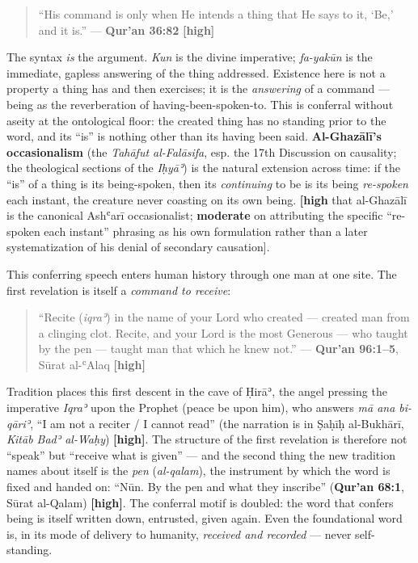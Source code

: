 \documentclass[11pt]{article}
\begin{document}
\begin{quote}
``His command is only when He intends a thing that He says to it, `Be,' and it is.'' — \textbf{Qur'an 36:82} \textbf{[high]}
\end{quote}

The syntax \emph{is} the argument. \emph{Kun} is the divine imperative; \emph{fa-yakūn} is the immediate, gapless answering of the thing addressed. Existence here is not a property a thing has and then exercises; it is the \emph{answering} of a command — being as the reverberation of having-been-spoken-to. This is conferral without aseity at the ontological floor: the created thing has no standing prior to the word, and its ``is'' is nothing other than its having been said. \textbf{Al-Ghazālī's occasionalism} (the \emph{Tahāfut al-Falāsifa}, esp. the 17th Discussion on causality; the theological sections of the \emph{Iḥyāʾ}) is the natural extension across time: if the ``is'' of a thing is its being-spoken, then its \emph{continuing} to be is its being \emph{re-spoken} each instant, the creature never coasting on its own being. \textbf{[high} that al-Ghazālī is the canonical Ashʿarī occasionalist; \textbf{moderate} on attributing the specific ``re-spoken each instant'' phrasing as his own formulation rather than a later systematization of his denial of secondary causation].

This conferring speech enters human history through one man at one site. The first revelation is itself a \emph{command to receive}:

\begin{quote}
``Recite (\emph{iqraʾ}) in the name of your Lord who created — created man from a clinging clot. Recite, and your Lord is the most Generous — who taught by the pen — taught man that which he knew not.'' — \textbf{Qur'an 96:1–5}, Sūrat al-ʿAlaq \textbf{[high]}
\end{quote}

Tradition places this first descent in the cave of Ḥirāʾ, the angel pressing the imperative \emph{Iqraʾ} upon the Prophet (peace be upon him), who answers \emph{mā ana bi-qāriʾ}, ``I am not a reciter /\allowbreak{} I cannot read'' (the narration is in Ṣaḥīḥ al-Bukhārī, \emph{Kitāb Badʾ al-Waḥy}) \textbf{[high]}. The structure of the first revelation is therefore not ``speak'' but ``receive what is given'' — and the second thing the new tradition names about itself is the \emph{pen} (\emph{al-qalam}), the instrument by which the word is fixed and handed on: ``Nūn. By the pen and what they inscribe'' (\textbf{Qur'an 68:1}, Sūrat al-Qalam) \textbf{[high]}. The conferral motif is doubled: the word that confers being is itself written down, entrusted, given again. Even the foundational word is, in its mode of delivery to humanity, \emph{received and recorded} — never self-standing.
\end{document}

